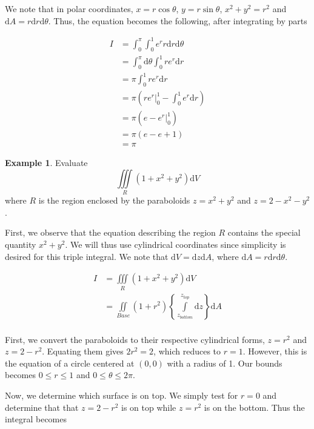 \documentclass[11pt]{article}
\theoremstyle{plain} %
\theoremstyle{definition}
\theoremstyle{example}
\newtheorem*{example}{Example}
\theoremstyle{remark}
\begin{document}
We note that in polar coordinates, $x= r\cos\theta$, $y= r\sin\theta$, $x^2 + y^2 = r^2$ and $\mathrm d A = r \mathrm d r \mathrm d \theta$. Thus, the equation becomes the following, after integrating by parts

\begin{align*}
I &= \int_0^{\pi}\int_0^1e^rr\mathrm d r \mathrm d \theta\\
&= \int_0^{\pi} \mathrm d \theta \int_0^1 re^r \mathrm d r\\
&= \pi \int_0^1re^r\mathrm d r\\
&= \pi \left(\left.re^r\right|_0^1 - \int_0^1e^r\mathrm d r\right)\\
&= \pi\left(e-\left.e^r\right|_0^1\right)\\
&= \pi(e-e+1)\\
&=\pi
\end{align*}

\begin{example}
Evaluate $$\iiint\limits_R \left(1+x^2+y^2 \right)\mathrm d V$$ where $R$ is the region enclosed by the paraboloids $z=x^2+y^2$ and $z=2-x^2-y^2$. 
\end{example}

First, we observe that the equation describing the region $R$ contains the special quantity $x^2+y^2$. We will thus use cylindrical coordinates since simplicity is desired for this triple integral. We note that $\mathrm d V = \mathrm d z \mathrm d A$, where $\mathrm d A = r \mathrm d r \mathrm d \theta$. 

\begin{align*}
	I &= \iiint \limits_R \left(1 + x^2 + y^2 \right) \mathrm d V\\
	&= \iint \limits_{Base} \left(1+r^2\right)  \left\{ \int \limits_{z_{bottom}}^{z_{top}} \mathrm d z \right\} \mathrm d A\\
\end{align*}

First, we convert the paraboloids to their respective cylindrical forms, $z=r^2$ and $z=2-r^2$. Equating them gives $2r^2=2$, which reduces to $r=1$. However, this is the equation of a circle centered at $(0,0)$ with a radius of 1. Our bounds becomes $0 \leq r \leq 1$ and $0 \leq \theta \leq 2\pi$. 

Now, we determine which surface is on top. We simply test for $r=0$ and determine that that $z=2-r^2$ is on top while $z=r^2$ is on the bottom. Thus the integral becomes
\end{document}
